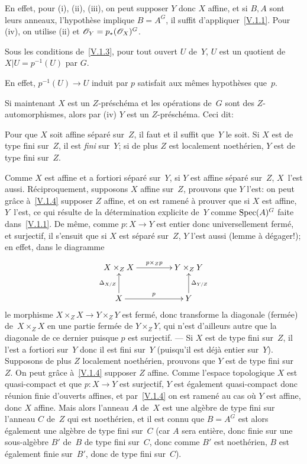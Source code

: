 En effet, pour
(i), (ii), (iii),
on peut supposer $Y$ donc $X$ affine, et
si $B,A$ sont leurs anneaux, l'hypoth\`ese implique $B=A^G$, il
suffit d'appliquer~\ref{V.1.1}. Pour (iv), on utilise (ii) et
$\cal{O}_Y=p_*(\cal{O}_X)^G$.

\begin{corollaire}
\label{V.1.4}
Sous les conditions de~\ref{V.1.3}, pour tout ouvert $U$ de~$Y$, $U$
est un quotient de~$X|U=p^{-1}(U)$ par $G$.
\end{corollaire}

En effet, $p^{-1}(U)\to{}U$ induit par $p$ satisfait aux m\^emes
hypoth\`eses que~$p$.

Si maintenant $X$ est un $Z$-pr\'esch\'ema et les op\'erations
de~$G$ sont des $Z$-automorphismes, alors par (iv) $Y$ est un
$Z$-pr\'esch\'ema. Ceci dit:

\begin{corollaire}
\label{V.1.5}
Pour que $X$ soit affine \resp s\'epar\'e sur~$Z$, il faut et il
suffit que~$Y$ le soit. Si $X$ est de type fini sur~$Z$, il est
\emph{fini} sur~$Y$; si de plus $Z$ est localement noeth\'erien, $Y$
est de type fini sur~$Z$.
\end{corollaire}

Comme $X$ est affine et a fortiori s\'epar\'e sur~$Y$, si $Y$ est
affine \resp s\'epar\'e sur~$Z$, $X$~l'est
aussi. R\'eciproquement, supposons $X$ affine sur~$Z$, prouvons que
$Y$ l'est: on peut gr\^ace \`a~\ref{V.1.4} supposer $Z$ affine, et
on est ramen\'e \`a prouver que si $X$ est affine, $Y$~l'est, ce
qui r\'esulte de la d\'etermination explicite de~$Y$ comme
$\operatorname{Spec}(A)^G$ faite dans~\ref{V.1.1}. De m\^eme, comme
$p\colon{}X\to{}Y$ est entier donc universellement ferm\'e, et
surjectif, il s'ensuit que si $X$ est s\'epar\'e sur~$Z$, $Y$
l'est aussi (lemme \`a d\'egager!); en effet, dans le diagramme
$$
\xymatrix@C=1.5cm{{X \times_ZX}\ar[r]^-{p\times_Zp}&{Y\times_ZY}\\{X}\ar[u]^{\Delta_{X/Z}}\ar[r]^{p}&{Y}\ar[u]_{\Delta_{Y/Z}}}
$$
le morphisme $X\times_ZX\to Y\times_ZY$ est ferm\'e, donc transforme
la diagonale (ferm\'ee) de~$X\times_ZX$ en une partie ferm\'ee de
$Y\times_ZY$, qui n'est d'ailleurs autre que la diagonale de ce
dernier puisque $p$ est surjectif.
--- Si $X$ est de type fini sur~$Z$, il l'est a fortiori sur~$Y$ donc
il est fini sur~$Y$ (puisqu'il est d\'ej\`a entier sur~$Y$). Supposons de plus $Z$ localement noeth\'erien, prouvons que
$Y$ est de type fini sur~$Z$. On peut gr\^ace \`a~\ref{V.1.4}
supposer $Z$ affine. Comme l'espace topologique $X$ est quasi-compact
et que $p\colon X\to Y$ est surjectif, $Y$ est
\'egalement
quasi-compact donc r\'eunion finie d'ouverts
affines, et par~\ref{V.1.4} on est ramen\'e au cas o\`u $Y$ est
affine, donc $X$ affine. Mais alors l'anneau $A$ de~$X$ est une
alg\`ebre de type fini sur l'anneau $C$ de~$Z$ qui est
noeth\'erien, et il est connu que $B=A^G$ est alors \'egalement
une alg\`ebre de type fini sur~$C$ (car $A$ sera enti\`ere, donc
finie sur une sous-alg\`ebre $B'$ de~$B$ de type fini sur~$C$, donc
comme $B'$ est noeth\'erien, $B$ est \'egalement
finie
sur~$B'$, donc de type fini sur~$C$).

